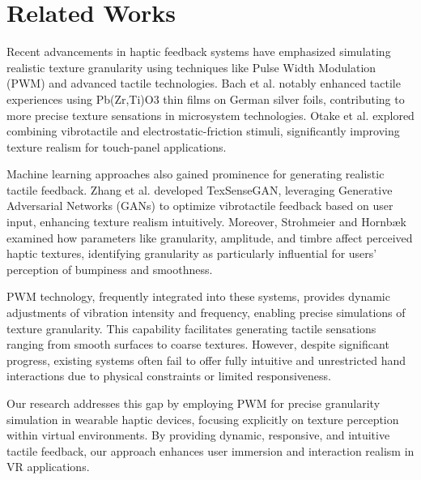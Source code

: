 \documentclass[graybox]{svmult}
\begin{document}
\section{Related Works}\label{sec:nssdn}
Recent advancements in haptic feedback systems have emphasized simulating realistic texture granularity using techniques like Pulse Width Modulation (PWM) and advanced tactile technologies. Bach et al. \cite{bach2023enhanced} notably enhanced tactile experiences using Pb(Zr,Ti)O3 thin films on German silver foils, contributing to more precise texture sensations in microsystem technologies. Otake et al. \cite{otake2022vibrotactile} explored combining vibrotactile and electrostatic-friction stimuli, significantly improving texture realism for touch-panel applications.

Machine learning approaches also gained prominence for generating realistic tactile feedback. Zhang et al. \cite{zhang2025texsensegan} developed TexSenseGAN, leveraging Generative Adversarial Networks (GANs) to optimize vibrotactile feedback based on user input, enhancing texture realism intuitively. Moreover, Strohmeier and Hornbæk \cite{strohmeier2017generating} examined how parameters like granularity, amplitude, and timbre affect perceived haptic textures, identifying granularity as particularly influential for users' perception of bumpiness and smoothness.

PWM technology, frequently integrated into these systems, provides dynamic adjustments of vibration intensity and frequency, enabling precise simulations of texture granularity. This capability facilitates generating tactile sensations ranging from smooth surfaces to coarse textures. However, despite significant progress, existing systems often fail to offer fully intuitive and unrestricted hand interactions due to physical constraints or limited responsiveness.

Our research addresses this gap by employing PWM for precise granularity simulation in wearable haptic devices, focusing explicitly on texture perception within virtual environments. By providing dynamic, responsive, and intuitive tactile feedback, our approach enhances user immersion and interaction realism in VR applications.
\end{document}
